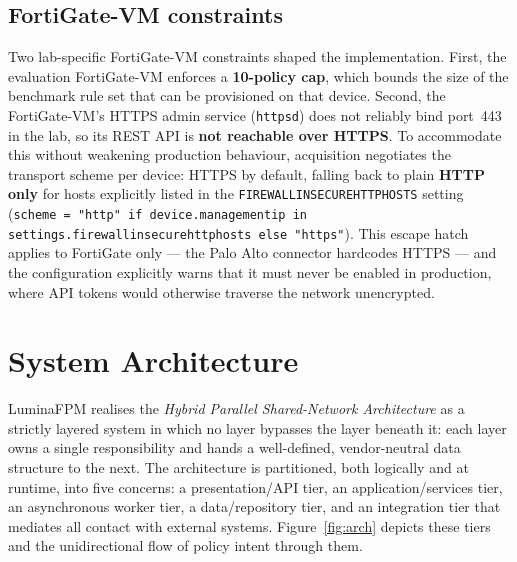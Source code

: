 \documentclass[12pt,a4paper]{report}
\renewcommand{\_}{\textunderscore\allowbreak}
\begin{document}
\subsection*{FortiGate-VM constraints}
Two lab-specific FortiGate-VM constraints shaped the implementation. First, the evaluation FortiGate-VM enforces a \textbf{10-policy cap}, which bounds the size of the benchmark rule set that can be provisioned on that device. Second, the FortiGate-VM's HTTPS admin service (\texttt{httpsd}) does not reliably bind port~443 in the lab, so its REST API is \textbf{not reachable over HTTPS}. To accommodate this without weakening production behaviour, acquisition negotiates the transport scheme per device: HTTPS by default, falling back to plain \textbf{HTTP only} for hosts explicitly listed in the \texttt{FIREWALL\_INSECURE\_HTTP\_HOSTS} setting (\texttt{scheme = "http" if device.management\_ip in settings.firewall\_insecure\_http\_hosts else "https"}). This escape hatch applies to FortiGate only — the Palo Alto connector hardcodes HTTPS — and the configuration explicitly warns that it must never be enabled in production, where API tokens would otherwise traverse the network unencrypted.

\section{System Architecture}
\label{sec:ch3-architecture}

LuminaFPM realises the \textit{Hybrid Parallel Shared-Network Architecture} as a strictly layered system in which no layer bypasses the layer beneath it: each layer owns a single responsibility and hands a well-defined, vendor-neutral data structure to the next. The architecture is partitioned, both logically and at runtime, into five concerns: a presentation/API tier, an application/services tier, an asynchronous worker tier, a data/repository tier, and an integration tier that mediates all contact with external systems. Figure~\ref{fig:arch} depicts these tiers and the unidirectional flow of policy intent through them.
\end{document}

